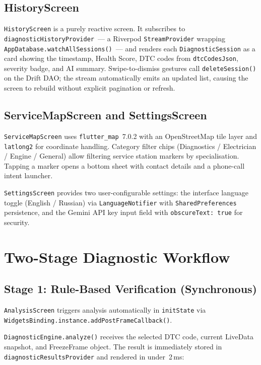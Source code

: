 \subsection{HistoryScreen}

\texttt{HistoryScreen} is a purely reactive screen.
It subscribes to \texttt{diagnosticHistoryProvider}~--- a Riverpod \texttt{StreamProvider} wrapping \texttt{AppDatabase.watchAllSessions()}~--- and renders each \texttt{DiagnosticSession} as a card showing the timestamp, Health Score, DTC codes from \texttt{dtcCodesJson}, severity badge, and AI summary.
Swipe-to-dismiss gestures call \texttt{deleteSession()} on the Drift DAO; the stream automatically emits an updated list, causing the screen to rebuild without explicit pagination or refresh.

\subsection{ServiceMapScreen and SettingsScreen}

\texttt{ServiceMapScreen} uses \texttt{flutter\_map}~7.0.2 with an OpenStreetMap tile layer and \texttt{latlong2} for coordinate handling.
Category filter chips (Diagnostics / Electrician / Engine / General) allow filtering service station markers by specialisation.
Tapping a marker opens a bottom sheet with contact details and a phone-call intent launcher.

\texttt{SettingsScreen} provides two user-configurable settings: the interface language toggle (English / Russian) via \texttt{LanguageNotifier} with \texttt{SharedPreferences} persistence, and the Gemini API key input field with \texttt{obscureText: true} for security.

\section{Two-Stage Diagnostic Workflow}
\label{sec:workflow}

\subsection{Stage 1: Rule-Based Verification (Synchronous)}

\texttt{AnalysisScreen} triggers analysis automatically in \texttt{initState} via \texttt{WidgetsBinding.instance.addPostFrameCallback()}.

\texttt{DiagnosticEngine.analyze()} receives the selected DTC code, current LiveData snapshot, and FreezeFrame object.
The result is immediately stored in \texttt{diagnosticResultsProvider} and rendered in under~2\,ms:

